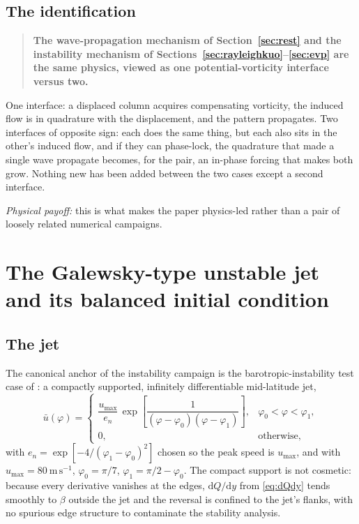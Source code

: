 \documentclass[11pt,a4paper]{article}
\newcommand{\dd}{\mathrm{d}}
\begin{document}
\subsection{The identification}

\begin{quote}
\textbf{The wave-propagation mechanism of Section~\ref{sec:rest} and the
instability mechanism of Sections~\ref{sec:rayleighkuo}--\ref{sec:evp} are the
same physics, viewed as one potential-vorticity interface versus two.}
\end{quote}

One interface: a displaced column acquires compensating vorticity, the induced
flow is in quadrature with the displacement, and the pattern propagates. Two
interfaces of opposite sign: each does the same thing, but each also sits in the
other's induced flow, and if they can phase-lock, the quadrature that made a
single wave propagate becomes, for the pair, an in-phase forcing that makes both
grow. Nothing new has been added between the two cases except a second
interface.

\medskip
\noindent\emph{Physical payoff:} this is what makes the paper physics-led rather
than a pair of loosely related numerical campaigns.

\section{The Galewsky-type unstable jet and its balanced initial condition}
\label{sec:galewsky}

\subsection{The jet}

The canonical anchor of the instability campaign is the barotropic-instability
test case of \citet{galewsky2004}: a compactly supported, infinitely
differentiable mid-latitude jet,
%
\begin{equation}
\bar u(\varphi) =
\begin{cases}
\dfrac{u_{\max}}{e_n}\,
 \exp\!\left[\dfrac{1}{(\varphi-\varphi_0)(\varphi-\varphi_1)}\right],
 & \varphi_0 < \varphi < \varphi_1,\\[8pt]
0, & \text{otherwise},
\end{cases}
\label{eq:galewskyjet}
\end{equation}
%
with $e_n = \exp[-4/(\varphi_1-\varphi_0)^2]$ chosen so the peak speed is
$u_{\max}$, and with $u_{\max} = 80\ \mathrm{m\,s^{-1}}$,
$\varphi_0 = \pi/7$, $\varphi_1 = \pi/2 - \varphi_0$. The compact support is not
cosmetic: because every derivative vanishes at the edges, $\dd Q/\dd y$ from
\eqref{eq:dQdy} tends smoothly to $\beta$ outside the jet and the reversal is
confined to the jet's flanks, with no spurious edge structure to contaminate the
stability analysis.
\end{document}
